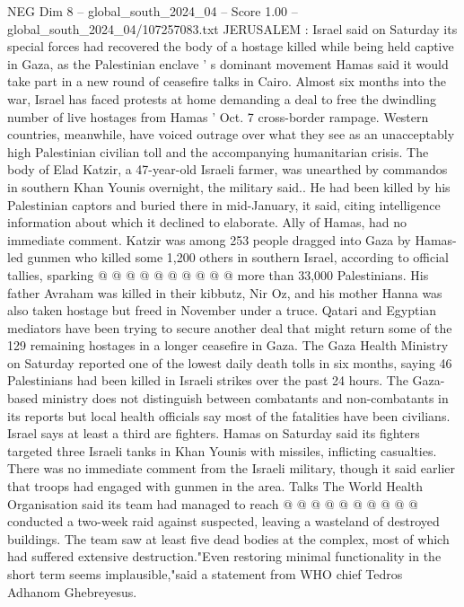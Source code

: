 \begin{textsample}{NEG Dim 8 – global\_south\_2024\_04 – Score 1.00 – global\_south\_2024\_04/107257083.txt}  \label{ex:f8_neg_268}
JERUSALEM : Israel said on Saturday its special forces had recovered the body of a hostage killed while being held captive in Gaza, as the Palestinian enclave ' s dominant movement Hamas said it would take part in a new round of ceasefire talks in Cairo.
Almost six months into the war, Israel has faced protests at home demanding a deal to free the dwindling number of live hostages from Hamas ' Oct. 7 cross-border rampage.
Western countries, meanwhile, have voiced outrage over what they see as an unacceptably high Palestinian civilian toll and the accompanying humanitarian crisis.
The body of Elad Katzir, a 47-year-old Israeli farmer, was unearthed by commandos in southern Khan Younis overnight, the military said..
He had been killed by his Palestinian captors and buried there in mid-January, it said, citing intelligence information about which it declined to elaborate.
Ally of Hamas, had no immediate comment.
Katzir was among 253 people dragged into Gaza by Hamas-led gunmen who killed some 1,200 others in southern Israel, according to official tallies, sparking @ @ @ @ @ @ @ @ @ @ more than 33,000 Palestinians.
His father Avraham was killed in their kibbutz, Nir Oz, and his mother Hanna was also taken hostage but freed in November under a truce.
Qatari and Egyptian mediators have been trying to secure another deal that might return some of the 129 remaining hostages in a longer ceasefire in Gaza.
The Gaza Health Ministry on Saturday reported one of the lowest daily death tolls in six months, saying 46 Palestinians had been killed in Israeli strikes over the past 24 hours.
The Gaza-based ministry does not distinguish between combatants and non-combatants in its reports but local health officials say most of the fatalities have been civilians.
Israel says at least a third are fighters.
Hamas on Saturday said its fighters targeted three Israeli tanks in Khan Younis with missiles, inflicting casualties.
There was no immediate comment from the Israeli military, though it said earlier that troops had engaged with gunmen in the area.
Talks The World Health Organisation said its team had managed to reach @ @ @ @ @ @ @ @ @ @ conducted a two-week raid against suspected, leaving a wasteland of destroyed buildings.
The team saw at least five dead bodies at the complex, most of which had suffered extensive destruction."Even restoring minimal functionality in the short term seems implausible,"said a statement from WHO chief Tedros Adhanom Ghebreyesus.

\end{textsample}
